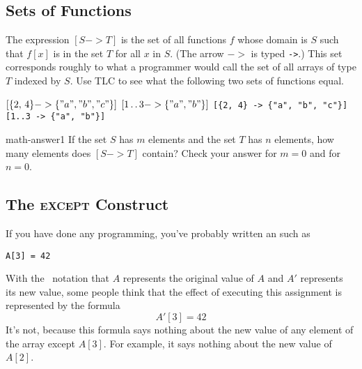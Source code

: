 \documentclass[fleqn,leqno]{article}
\begin{document}
\subsection[Sets of Functions]{Sets of Functions%
  }%


The expression $[S -> T]$ is the set of all functions $f$ whose domain
is $S$ such that $f[x]$ is in the set $T$ for all $x$ in $S$.  (The
arrow $->$ is typed \verb|->|.)  This set corresponds roughly to what
a programmer would call the set of all arrays of type $T$ indexed by
$S$.  Use TLC to see what the following two sets of functions equal.
\begin{twocols}
$[\{2,\, 4\} -> \{"a", "b", "c"\}]$
$[1\dd3 -> \{"a", "b"\}]$
\midcol
\verb|[{2, 4} -> {"a", "b", "c"}]|
\verb|[1..3 -> {"a", "b"}] |
\end{twocols}
\begin{aquestion}{math-answer1}
If the set $S$  has $m$ elements and the set $T$ has $n$ elements,
how many elements does $[S -> T]$ contain?  Check your answer for
$m=0$ and for $n=0$.
\end{aquestion}

\subsection[The {\rm\textsc{except}} Construct]{%
  The {\rm\textsc{except}} Construct%
}


If you have done any programming, you've probably written an 
 such as
\begin{display}
\texttt{A[3] = 42}
\end{display}
With the \tlaplus\ notation that $A$ represents the original value of
$A$ and $A'$ represents its new value, some people think that
the effect of executing this assignment is represented by the formula
 \[A'[3] = 42\]
It's not, because this formula says nothing about the new value of any
element of the array except $A[3]$.  For example, it says nothing
about the new value of $A[2]$.
\end{document}
